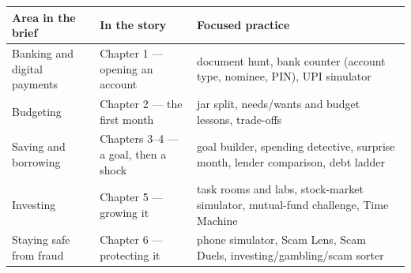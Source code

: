 \documentclass[10pt,a4paper]{article}
\begin{document}
\begin{center}\small
\begin{tabular}{@{}p{4.0cm}p{5.2cm}p{6.6cm}@{}}
\toprule
\textbf{Area in the brief} & \textbf{In the story} & \textbf{Focused practice}\\
\midrule
Banking and digital payments & Chapter 1 --- opening an account & document hunt, bank counter (account type, nominee, PIN), UPI simulator\\
Budgeting & Chapter 2 --- the first month & jar split, needs/wants and budget lessons, trade-offs\\
Saving and borrowing & Chapters 3--4 --- a goal, then a shock & goal builder, spending detective, surprise month, lender comparison, debt ladder\\
Investing & Chapter 5 --- growing it & task rooms and labs, stock-market simulator, mutual-fund challenge, Time Machine\\
Staying safe from fraud & Chapter 6 --- protecting it & phone simulator, Scam Lens, Scam Duels, investing/gambling/scam sorter\\
\bottomrule
\end{tabular}
\end{center}
\end{document}
